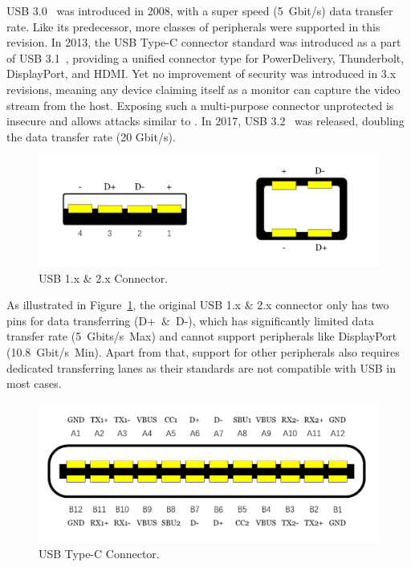 \ac{USB} 3.0~\cite{usb30} was introduced in 2008, with a super speed \mbox{(5 Gbit/s)} data
transfer rate. Like its predecessor, more classes of peripherals were supported
in this revision. In 2013, the \ac{USB} Type-C connector standard was introduced as a
part of \ac{USB} 3.1~\cite{usb31}, providing a unified connector type for
PowerDelivery, Thunderbolt, DisplayPort, and HDMI.  Yet no improvement of
security was introduced in 3.x revisions, meaning any device claiming
itself as a monitor can capture the video stream from the host. Exposing
such a multi-purpose connector unprotected is insecure and allows attacks similar to \tool. In 2017, \ac{USB} 3.2~\cite{usb32} was released, doubling the data
transfer rate (20 Gbit/s).

\begin{figure}[t]
    \centering
	\includegraphics[width=0.7\linewidth]{./Figs/usb_conn.png}
	\caption{\ac{USB} 1.x \& 2.x Connector.}
	\label{fig:usb_conn}
\end{figure}

As illustrated in Figure~\ref{fig:usb_conn}, the original \ac{USB} 1.x \& 2.x
connector only has two pins for data transferring \mbox{(D+ \& D-)}, which has
significantly limited data transfer rate \mbox{(5 Gbits/s Max)} and cannot support
peripherals like DisplayPort \mbox{(10.8 Gbit/s Min)}. Apart from that, support for
other peripherals also requires dedicated transferring lanes as their standards
are not compatible with \ac{USB} in most cases.  

\begin{figure}[t] 
	\centering
	\includegraphics[width=\linewidth]{./Figs/usb_c_conn.png} 
	\caption{\ac{USB} Type-C Connector.} 
	\label{fig:usb_c_conn} 
\end{figure}

